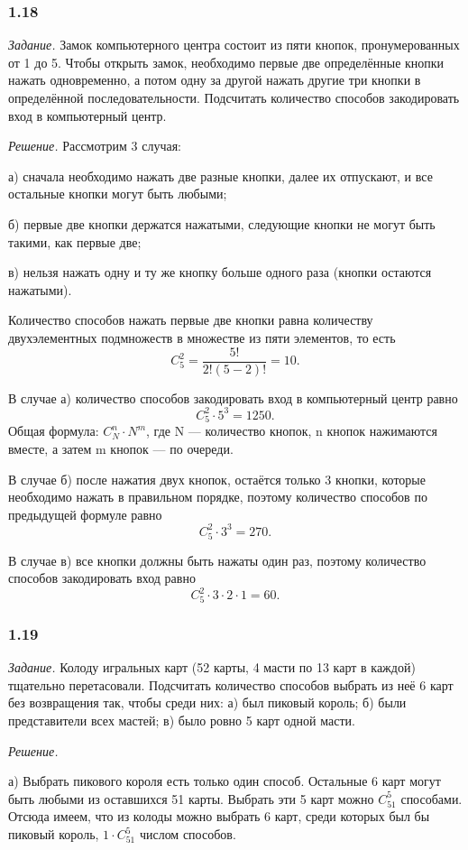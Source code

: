\documentclass{book}
\begin{document}
\subsubsection*{1.18}

\textit{Задание.} Замок компьютерного центра состоит из пяти кнопок, пронумерованных от 1 до 5. Чтобы открыть замок, необходимо первые две определённые кнопки нажать одновременно, а потом одну за другой нажать другие три кнопки в определённой последовательности. Подсчитать количество способов закодировать вход в компьютерный центр.

\textit{Решение.} Рассмотрим 3 случая: 

а) сначала необходимо нажать две разные кнопки, далее их отпускают, и все остальные кнопки могут быть любыми; 

б) первые две кнопки держатся нажатыми, следующие кнопки не могут быть такими, как первые две; 

в) нельзя нажать одну и ту же кнопку больше одного раза (кнопки остаются нажатыми).

Количество способов нажать первые две кнопки равна количеству двухэлементных подмножеств в множестве из пяти элементов, то есть $$C_5^2=\frac{5!}{2!\left(5-2\right)!}=10.$$

В случае а) количество способов закодировать вход в компьютерный центр равно $$C_5^2\cdot 5^3=1250.$$ Общая формула: $C_N^n\cdot N^m$, где N --- количество кнопок, n кнопок нажимаются вместе, а затем m кнопок --- по очереди.

В случае б) после нажатия двух кнопок, остаётся только 3 кнопки, которые необходимо нажать в правильном порядке, поэтому количество способов по предыдущей формуле равно $$C_5^2\cdot 3^3=270.$$

В случае в) все кнопки должны быть нажаты один раз, поэтому количество способов закодировать вход равно $$C_5^2\cdot 3\cdot 2\cdot 1=60.$$

\subsubsection*{1.19}

\textit{Задание.} Колоду игральных карт (52 карты, 4 масти по 13 карт в каждой) тщательно перетасовали. Подсчитать количество способов выбрать из неё 6 карт без возвращения так, чтобы среди них: а) был пиковый король; б) были представители всех мастей; в) было ровно 5 карт одной масти.

\textit{Решение.}

а) Выбрать пикового короля есть только один способ. Остальные 6 карт могут быть любыми из оставшихся 51 карты. Выбрать эти 5 карт можно $C_{51}^5$ способами. Отсюда имеем, что из колоды можно выбрать 6 карт, среди которых был бы пиковый король, $1\cdot C_{51}^5$ числом способов.
\end{document}
